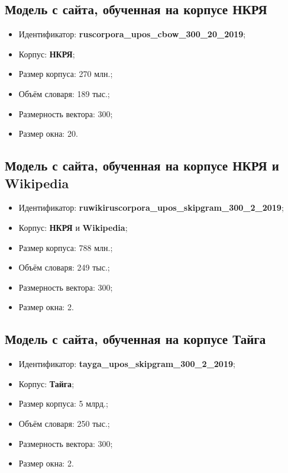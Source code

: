 \documentclass[oneside,final,12pt]{article}
\begin{document}
\subsection{Модель с сайта, обученная на корпусе НКРЯ}

\begin{itemize}
	\item Идентификатор:  \textbf{ruscorpora\_upos\_cbow\_300\_20\_2019};
	\item Корпус: \textbf{НКРЯ};
	\item Размер корпуса: 270 млн.;
	\item Объём словаря: 189 тыс.;
	\item Размерность вектора: 300;
	\item Размер окна: 20.
\end{itemize}

\subsection{Модель с сайта, обученная на корпусе НКРЯ и Wikipedia}

\begin{itemize}
	\item Идентификатор:  \textbf{ruwikiruscorpora\_upos\_skipgram\_300\_2\_2019};
	\item Корпус: \textbf{НКРЯ} и \textbf{Wikipedia};
	\item Размер корпуса: 788 млн.;
	\item Объём словаря: 249 тыс.;
	\item Размерность вектора: 300;
	\item Размер окна: 2.
\end{itemize}

\subsection{Модель с сайта, обученная на корпусе Тайга}

\begin{itemize}
	\item Идентификатор:  \textbf{tayga\_upos\_skipgram\_300\_2\_2019};
	\item Корпус: \textbf{Тайга};
	\item Размер корпуса: 5 млрд.;
	\item Объём словаря: 250 тыс.;
	\item Размерность вектора: 300;
	\item Размер окна: 2.
\end{itemize}
\end{document}

